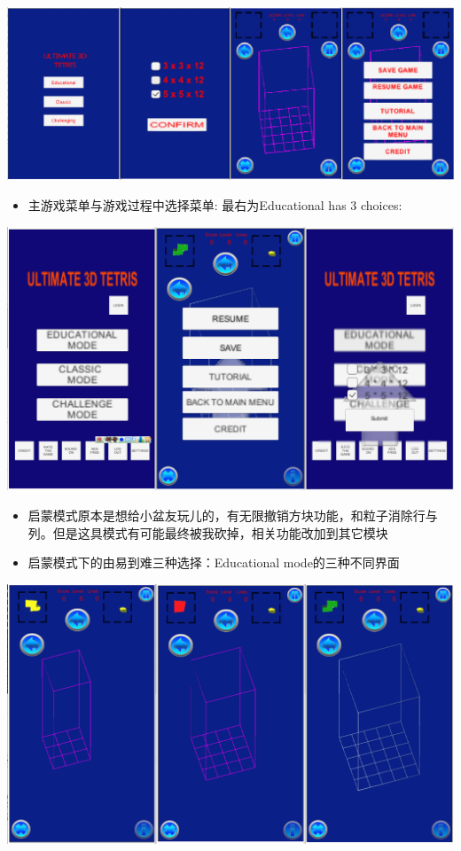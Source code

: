 \documentclass[9pt, b5paper]{article}
\begin{document}
\includegraphics[width=.9\linewidth]{./pic/readme_20221011_201317.png} 
\begin{itemize}
\item 主游戏菜单与游戏过程中选择菜单: 最右为Educational has 3 choices:
\end{itemize}

\includegraphics[width=.9\linewidth]{./pic/readme_20221007_192732.png}
\begin{itemize}
\item 启蒙模式原本是想给小盆友玩儿的，有无限撤销方块功能，和粒子消除行与列。但是这具模式有可能最终被我砍掉，相关功能改加到其它模块　
\item 启蒙模式下的由易到难三种选择：Educational mode的三种不同界面
\end{itemize}

\includegraphics[width=.9\linewidth]{./pic/readme_20222007_193727.png}
\end{document}

